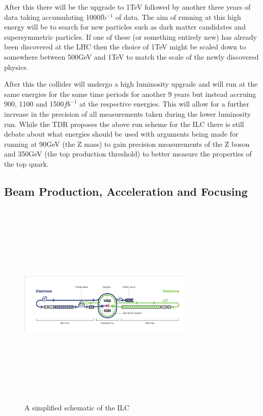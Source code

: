 After this there will be the upgrade to 1TeV followed by another three years of data taking accumulating 1000fb${^{-1}}$ of data. The aim of running at this high energy will be to search for new particles such as dark matter candidates and supersymmetric particles. If one of these (or something entirely new) has already been discovered at the \ac{LHC} then the choice of 1TeV might be scaled down to somewhere between 500GeV and 1TeV to match the scale of the newly discovered physics.

After this the collider will undergo a high luminosity upgrade and will run at the same energies for the same time periods for another 9 years but instead accruing 900, 1100 and 1500${fb^{-1}}$ at the respective energies. This will allow for a further increase in the precision of all measurements taken during the lower luminosity run.
While the \ac{TDR} proposes the above run scheme for the \ac{ILC} there is still debate about what energies should be used with arguments being made for running at 90GeV (the Z mass) to gain precision measurements of the Z boson and 350GeV (the top production threshold) to better measure the properties of the top quark.

\subsection{Beam Production, Acceleration and Focusing}
\label{ILC:BEAM}

\begin{figure}
  \centering
  \includegraphics[width=0.75\textwidth,height=10cm,keepaspectratio]{Experiments/fig/ILC_Simplified}
  \caption[Schematic Of The ILC]{A simplified schematic of the ILC}
  \label{Fig:ILCsimple}
\end{figure}

